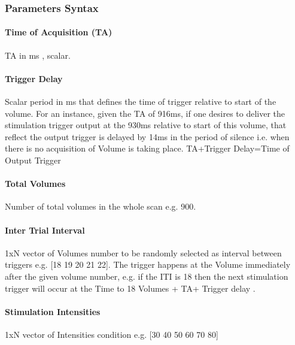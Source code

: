 \documentclass[letterpaper,10pt,english]{sphinxmanual}
\begin{document}
\subsubsection{Parameters Syntax}
\label{\detokenize{14_TMSfMRIMeasurement:parameters-syntax}}

\paragraph{Time of Acquisition (TA)}
\label{\detokenize{14_TMSfMRIMeasurement:time-of-acquisition-ta}}
\sphinxAtStartPar
TA in ms , scalar.


\paragraph{Trigger Delay}
\label{\detokenize{14_TMSfMRIMeasurement:trigger-delay}}
\sphinxAtStartPar
Scalar period in ms that defines the time of trigger relative to start of the volume. For an instance, given the TA of 916ms, if one desires to deliver the stimulation trigger output at the 930ms relative to start of this volume, that reflect the output trigger is delayed by 14ms in the period of silence i.e. when there is no acquisition of Volume is taking place. TA+Trigger Delay=Time of Output Trigger


\paragraph{Total Volumes}
\label{\detokenize{14_TMSfMRIMeasurement:total-volumes}}
\sphinxAtStartPar
Number of total volumes in the whole scan e.g. 900.


\paragraph{Inter Trial Interval}
\label{\detokenize{14_TMSfMRIMeasurement:inter-trial-interval}}
\sphinxAtStartPar
1xN vector of Volumes number to be randomly selected as interval between triggers e.g. {[}18 19 20 21 22{]}. The trigger happens at the Volume immediately after the given volume number, e.g. if the ITI is 18 then the next stimulation trigger will occur at the Time to 18 Volumes + TA+ Trigger delay .


\paragraph{Stimulation Intensities}
\label{\detokenize{14_TMSfMRIMeasurement:stimulation-intensities}}
\sphinxAtStartPar
1xN vector of Intensities condition e.g. {[}30 40 50 60 70 80{]}
\end{document}
